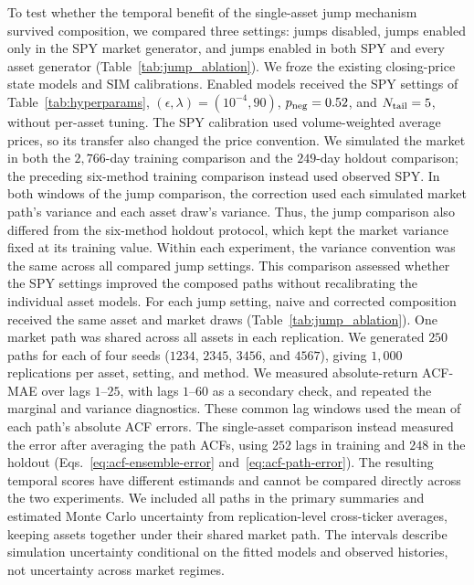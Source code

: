 To test whether the temporal benefit of the single-asset jump mechanism
survived composition, we compared three settings: jumps disabled,
jumps enabled only in the SPY market generator, and jumps enabled in
both SPY and every asset generator
(Table~\ref{tab:jump_ablation}). We froze the existing closing-price
state models and SIM calibrations. Enabled models received the SPY
settings of Table~\ref{tab:hyperparams}, $(\epsilon,\lambda)=(10^{-4},90)$, $p_{\rm neg}=0.52$, and
$N_{\rm tail}=5$, without per-asset tuning. The SPY calibration used volume-weighted average prices, so its
transfer also changed the price convention. We simulated the market in both the
$2{,}766$-day training comparison and the $249$-day holdout comparison;
the preceding six-method training comparison instead used observed
SPY. In both windows of the jump comparison, the correction used each
simulated market path's variance and each asset draw's variance. Thus,
the jump comparison also differed from the six-method holdout protocol,
which kept the market variance fixed at its training value. Within
each experiment, the variance convention was the same across all
compared jump settings. This comparison assessed whether the SPY settings improved the
composed paths without recalibrating the individual asset models.
For each jump setting, naive and corrected composition received the
same asset and market draws (Table~\ref{tab:jump_ablation}). One market path was shared across all
assets in each replication. We generated $250$ paths for each of four
seeds ($1234$, $2345$, $3456$, and $4567$), giving $1{,}000$
replications per asset, setting, and method. We measured absolute-return
ACF-MAE over lags $1$--$25$, with lags $1$--$60$ as a secondary check,
and repeated the marginal and variance diagnostics. These common lag
windows used the mean of each path's absolute ACF errors. The
single-asset comparison instead measured the error after averaging
the path ACFs, using $252$ lags in training and $248$ in the
holdout (Eqs.~\eqref{eq:acf-ensemble-error} and~\eqref{eq:acf-path-error}).
The resulting temporal scores have different estimands and cannot
be compared directly across the two experiments.
We included all paths in the primary summaries and estimated Monte
Carlo uncertainty from replication-level cross-ticker averages, keeping
assets together under their shared market path. The intervals describe
simulation uncertainty conditional on the fitted models and observed
histories, not uncertainty across market regimes.
